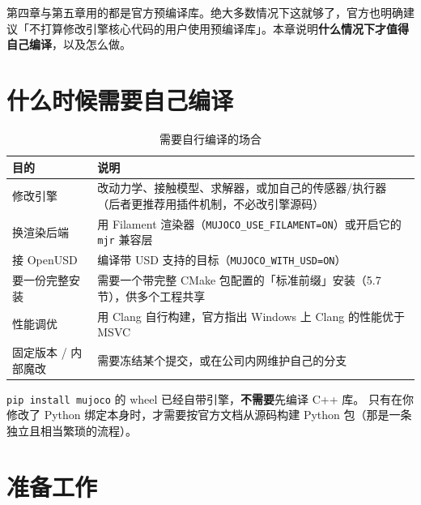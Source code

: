 
第四章与第五章用的都是官方预编译库。绝大多数情况下这就够了，官方也明确建议「不打算修改引擎核心代码的用户使用预编译库」。本章说明\textbf{什么情况下才值得自己编译}，以及怎么做。

\section{什么时候需要自己编译}

\begin{table}[H]
	\centering
	\caption{需要自行编译的场合}
	\label{tab:Build:场合}
	\footnotesize
	\begin{tabular}{>{\raggedright\arraybackslash}p{4.4cm}>{\raggedright\arraybackslash}p{9.8cm}}
		\hline
		目的 & 说明 \\
		\hline
		修改引擎 & 改动力学、接触模型、求解器，或加自己的传感器/执行器（后者更推荐用插件机制，不必改引擎源码） \\
		换渲染后端 & 用 Filament 渲染器（\texttt{MUJOCO\_USE\_FILAMENT=ON}）或开启它的 \texttt{mjr} 兼容层 \\
		接 OpenUSD & 编译带 USD 支持的目标（\texttt{MUJOCO\_WITH\_USD=ON}） \\
		要一份完整安装 & 需要一个带完整 CMake 包配置的「标准前缀」安装（5.7 节），供多个工程共享 \\
		性能调优 & 用 Clang 自行构建，官方指出 Windows 上 Clang 的性能优于 MSVC \\
		固定版本 / 内部魔改 & 需要冻结某个提交，或在公司内网维护自己的分支 \\
		\hline
	\end{tabular}
\end{table}

\begin{warnbox}
	\texttt{pip install mujoco} 的 wheel 已经自带引擎，\textbf{不需要}先编译 C++ 库。
	只有在你修改了 Python 绑定本身时，才需要按官方文档从源码构建 Python 包（那是一条独立且相当繁琐的流程）。
\end{warnbox}

\section{准备工作}

